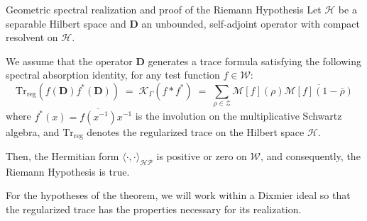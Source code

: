 \documentclass[Riemann_Hypothesis.tex]{subfiles}
\begin{document}
\begin{theoremEn}[label=th:ResolutionConjectureHP_intro]{Geometric spectral realization and proof of the Riemann Hypothesis}
    Let $\mathcal{H}$ be a separable Hilbert space and $\mathbf{D}$ an unbounded, self-adjoint operator with compact resolvent on $\mathcal{H}$. \par
    We assume that the operator $\mathbf{D}$ generates a trace formula satisfying the following spectral absorption identity, for any test function $f \in \mathcal{W}$:
    \begin{equation*}
        \mathrm{Tr}_{\mathrm{reg}}\left( f(\mathbf{D}) f^*(\mathbf{D}) \right) \;=\; \mathcal{K}_\Gamma(f * f^*) \;=\; \sum_{\rho \in \mathcal{Z}} \mathcal{M}[f](\rho) \overline{\mathcal{M}[f](1-\bar{\rho})}
    \end{equation*}
    where $f^*(x) = \overline{f(x^{-1})} x^{-1}$ is the involution on the multiplicative Schwartz algebra, and $\mathrm{Tr}_{\mathrm{reg}}$ denotes the regularized trace on the Hilbert space $\mathcal{H}$. \par
    Then, the Hermitian form $\langle \cdot, \cdot \rangle_{\mathcal{HP}}$ is positive or zero on $\mathcal{W}$, and consequently, the Riemann Hypothesis is true.
\end{theoremEn}

For the hypotheses of the theorem, we will work within a Dixmier 
ideal so that the regularized trace has the properties necessary 
for its realization.
\end{document}
